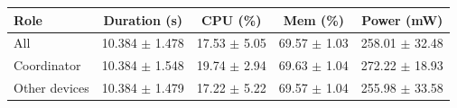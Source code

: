\begin{tabular}{lcccc}
\hline
\textbf{Role} & \textbf{Duration (s)} & \textbf{CPU (\%)} & \textbf{Mem (\%)} & \textbf{Power (mW)} \\
\hline
All & 10.384 $\pm$ 1.478 & 17.53 $\pm$ 5.05 & 69.57 $\pm$ 1.03 & 258.01 $\pm$ 32.48 \\
Coordinator & 10.384 $\pm$ 1.548 & 19.74 $\pm$ 2.94 & 69.63 $\pm$ 1.04 & 272.22 $\pm$ 18.93 \\
Other devices & 10.384 $\pm$ 1.479 & 17.22 $\pm$ 5.22 & 69.57 $\pm$ 1.04 & 255.98 $\pm$ 33.58 \\
\hline
\end{tabular}
